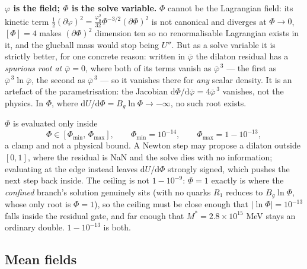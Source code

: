 \documentclass[11pt,a4paper]{article}
\newcommand{\phib}{\bar\varphi}
\newcommand{\Mstar}{M^{*}}
\begin{document}
\textbf{$\varphi$ is the field; $\Phi$ is the solve variable.} $\Phi$ cannot be
the Lagrangian field: its kinetic term
$\tfrac12(\partial\varphi)^2 = \tfrac{\varphi_0^2}{32}\Phi^{-3/2}(\partial\Phi)^2$
is not canonical and diverges at $\Phi\to0$, $[\Phi]=4$ makes
$(\partial\Phi)^2$ dimension ten so no renormalisable Lagrangian exists in it,
and the glueball mass would stop being $U''$. But as a solve variable it is
strictly better, for one concrete reason: written in $\phib$ the dilaton
residual has a \emph{spurious root at $\phib=0$}, where both of its terms vanish
as $\phib^{\,3}$ --- the first as $\phib^{\,3}\ln\phib$, the second as
$\phib^{\,3}$ --- so it vanishes there for \emph{any} scalar density. It is an
artefact of the parametrisation: the Jacobian $\mathrm d\Phi/\mathrm d\phib =
4\phib^{\,3}$ vanishes, not the physics. In $\Phi$, where
$\mathrm dU/\mathrm d\Phi=B_g\ln\Phi\to-\infty$, no such root exists.

$\Phi$ is evaluated only inside
\begin{equation}
\Phi\in\left[\Phi_{\min},\,\Phi_{\max}\right],
\qquad \Phi_{\min}=10^{-14},\qquad \Phi_{\max}=1-10^{-13},
\label{eq:phiguard}
\end{equation}
a clamp and not a physical bound. A Newton step may propose a dilaton outside
$[0,1]$, where the residual is NaN and the solve dies with no information;
evaluating at the edge instead leaves $\mathrm dU/\mathrm d\Phi$ strongly
signed, which pushes the next step back inside. The ceiling is not
$1-10^{-9}$: $\Phi=1$ exactly is where the \emph{confined} branch's solution
genuinely sits (with no quarks $R_1$ reduces to $B_g\ln\Phi$, whose only root
is $\Phi=1$), so the ceiling must be close enough that $|\ln\Phi|=10^{-13}$
falls inside the residual gate, and far enough that $\Mstar=2.8\times10^{15}$
MeV stays an ordinary double. $1-10^{-13}$ is both.

\subsection{Mean fields}
\end{document}
